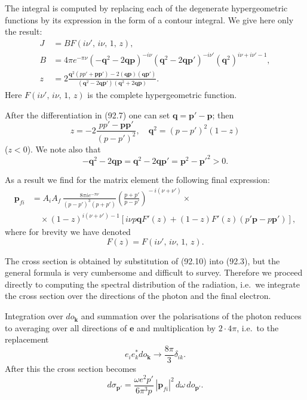 The integral is computed by replacing each of the degenerate hypergeometric functions by its expression in the form of a contour integral. We give here only the result:
\begin{equation}
\begin{aligned}
J &= BF(i\nu',\,i\nu,\,1,\,z), \\
B &= 4\pi e^{-\pi\nu}(-\mathbf{q}^2 - 2\mathbf{qp})^{-i\nu}(\mathbf{q}^2 - 2\mathbf{qp}')^{-i\nu'}(\mathbf{q}^2)^{i\nu+i\nu'-1}, \\
z &= 2\frac{\mathbf{q}^2(pp' + \mathbf{pp}') - 2(\mathbf{qp})(\mathbf{qp}')}{(\mathbf{q}^2 - 2\mathbf{qp}')(\mathbf{q}^2 + 2\mathbf{qp})}.
\end{aligned}
\label{eq:92.8}
\end{equation}
Here $F(i\nu',\,i\nu,\,1,\,z)$ is the complete hypergeometric function.

After the differentiation in (92.7) one can set $\mathbf{q} = \mathbf{p}' - \mathbf{p}$; then
\begin{equation}
z = -2\frac{pp' - \mathbf{pp}'}{(p - p')^2}, \quad \mathbf{q}^2 = (p - p')^2(1 - z)
\label{eq:92.9}
\end{equation}
($z < 0$). We note also that
\[
-\mathbf{q}^2 - 2\mathbf{qp} = \mathbf{q}^2 - 2\mathbf{qp}' = \mathbf{p}^2 - \mathbf{p}'^2 > 0.
\]

As a result we find for the matrix element the following final expression:
\begin{equation}
\begin{split}
\mathbf{p}_{fi} &= A_iA_f\,\frac{8\pi i e^{-\pi\nu}}{(p-p')^3(p+p')}\left(\frac{p+p'}{p-p'}\right)^{\!-i(\nu+\nu')} \times {} \\
&\quad \times (1-z)^{i(\nu+\nu')-1}[i\nu p\mathbf{q} F'(z) + (1-z)F'(z)(p'\mathbf{p} - p\mathbf{p}')],
\end{split}
\label{eq:92.10}
\end{equation}
where for brevity we have denoted
\begin{equation}
F(z) = F(i\nu',\,i\nu,\,1,\,z).
\label{eq:92.11}
\end{equation}

The cross section is obtained by substitution of (92.10) into (92.3), but the general formula is very cumbersome and difficult to survey. Therefore we proceed directly to computing the spectral distribution of the radiation, i.e.\ we integrate the cross section over the directions of the photon and the final electron.

Integration over $do_\mathbf{k}$ and summation over the polarisations of the photon reduces to averaging over all directions of $\mathbf{e}$ and multiplication by $2 \cdot 4\pi$, i.e.\ to the replacement
\[
e_i e_k^* do_\mathbf{k} \to \frac{8\pi}{3}\delta_{ik}.
\]
After this the cross section becomes
\begin{equation}
d\sigma_{\mathbf{p}'} = \frac{\omega e^2 p'}{6\pi^3 p}\,|\mathbf{p}_{fi}|^2\,d\omega\,do_{\mathbf{p}'}.
\label{eq:92.12}
\end{equation}

